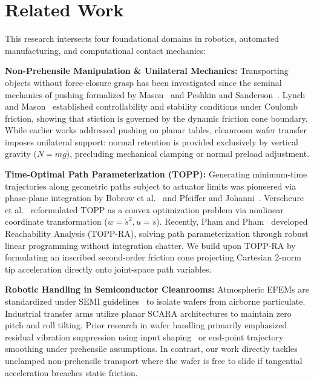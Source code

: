 \documentclass{article}
\begin{document}
\section{Related Work}
This research intersects four foundational domains in robotics, automated manufacturing, and computational contact mechanics:

\textbf{Non-Prehensile Manipulation \& Unilateral Mechanics:} Transporting objects without force-closure grasp has been investigated since the seminal mechanics of pushing formalized by Mason~\cite{mason1986mechanics} and Peshkin and Sanderson~\cite{peshkin1988motion}. Lynch and Mason~\cite{lynch1999dynamic} established controllability and stability conditions under Coulomb friction, showing that stiction is governed by the dynamic friction cone boundary. While earlier works addressed pushing on planar tables, cleanroom wafer transfer imposes unilateral support: normal retention is provided exclusively by vertical gravity ($N = mg$), precluding mechanical clamping or normal preload adjustment.

\textbf{Time-Optimal Path Parameterization (TOPP):} Generating minimum-time trajectories along geometric paths subject to actuator limits was pioneered via phase-plane integration by Bobrow et al.~\cite{bobrow1985time} and Pfeiffer and Johanni~\cite{pfeiffer1987concept}. Verscheure et al.~\cite{verscheure2009time} reformulated TOPP as a convex optimization problem via nonlinear coordinate transformation ($w = \dot{s}^2, u = \ddot{s}$). Recently, Pham and Pham~\cite{pham2018top} developed Reachability Analysis (TOPP-RA), solving path parameterization through robust linear programming without integration chatter. We build upon TOPP-RA by formulating an inscribed second-order friction cone projecting Cartesian 2-norm tip acceleration directly onto joint-space path variables.

\textbf{Robotic Handling in Semiconductor Cleanrooms:} Atmospheric EFEMs are standardized under SEMI guidelines~\cite{semi1999efem} to isolate wafers from airborne particulate. Industrial transfer arms utilize planar SCARA architectures to maintain zero pitch and roll tilting. Prior research in wafer handling primarily emphasized residual vibration suppression using input shaping~\cite{singer1990preshaping} or end-point trajectory smoothing under prehensile assumptions. In contrast, our work directly tackles unclamped non-prehensile transport where the wafer is free to slide if tangential acceleration breaches static friction.
\end{document}
